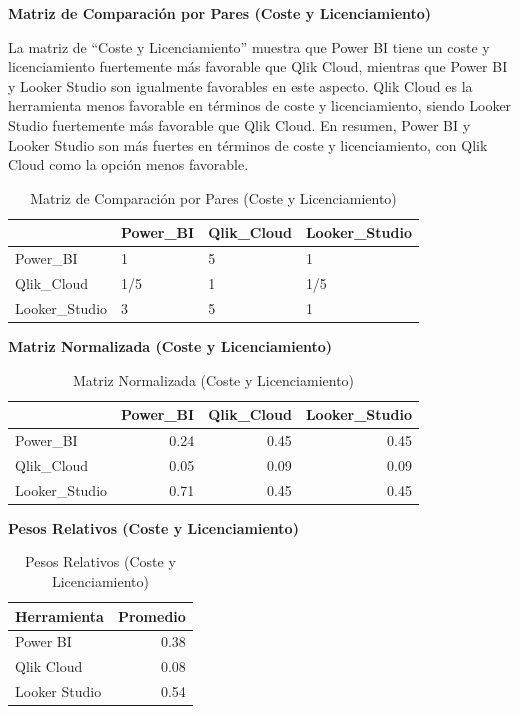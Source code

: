 \documentclass[
  11pt,
  bookmarksnumbered]{article}
\begin{document}
\textbf{Matriz de Comparación por Pares (Coste y Licenciamiento)}

La matriz de ``Coste y Licenciamiento'' muestra que Power BI tiene un coste y licenciamiento fuertemente más favorable que Qlik Cloud, mientras que Power BI y Looker Studio son igualmente favorables en este aspecto. Qlik Cloud es la herramienta menos favorable en términos de coste y licenciamiento, siendo Looker Studio fuertemente más favorable que Qlik Cloud. En resumen, Power BI y Looker Studio son más fuertes en términos de coste y licenciamiento, con Qlik Cloud como la opción menos favorable.

\begin{table}[H]

\caption{\label{tab:unnamed-chunk-51}Matriz de Comparación por Pares (Coste y Licenciamiento)}
\centering
\fontsize{12}{14}\selectfont
\begin{tabular}[t]{l|l|l|l}
\hline
  & Power\_BI & Qlik\_Cloud & Looker\_Studio\\
\hline
Power\_BI & 1 & 5 & 1\\
\hline
Qlik\_Cloud & 1/5 & 1 & 1/5\\
\hline
Looker\_Studio & 3 & 5 & 1\\
\hline
\end{tabular}
\end{table}

\textbf{Matriz Normalizada (Coste y Licenciamiento)}

\begin{table}[H]

\caption{\label{tab:unnamed-chunk-52}Matriz Normalizada (Coste y Licenciamiento)}
\centering
\fontsize{12}{14}\selectfont
\begin{tabular}[t]{l|r|r|r}
\hline
  & Power\_BI & Qlik\_Cloud & Looker\_Studio\\
\hline
Power\_BI & 0.24 & 0.45 & 0.45\\
\hline
Qlik\_Cloud & 0.05 & 0.09 & 0.09\\
\hline
Looker\_Studio & 0.71 & 0.45 & 0.45\\
\hline
\end{tabular}
\end{table}

\newpage

\textbf{Pesos Relativos (Coste y Licenciamiento)}

\begin{table}[H]

\caption{\label{tab:unnamed-chunk-53}Pesos Relativos (Coste y Licenciamiento)}
\centering
\fontsize{12}{14}\selectfont
\begin{tabular}[t]{l|r}
\hline
Herramienta & Promedio\\
\hline
Power BI & 0.38\\
\hline
Qlik Cloud & 0.08\\
\hline
Looker Studio & 0.54\\
\hline
\end{tabular}
\end{table}
\end{document}
